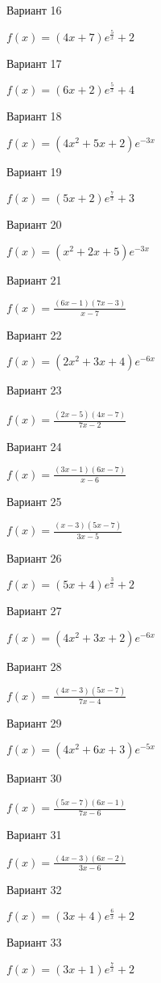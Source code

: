 \documentclass[11pt]{report}
\begin{document}
Вариант 16

$f(x) = \left(4 x + 7\right) e^{\frac{5}{x}} + 2$

Вариант 17

$f(x) = \left(6 x + 2\right) e^{\frac{5}{x}} + 4$

Вариант 18

$f(x) = \left(4 x^{2} + 5 x + 2\right) e^{- 3 x}$

Вариант 19

$f(x) = \left(5 x + 2\right) e^{\frac{7}{x}} + 3$

Вариант 20

$f(x) = \left(x^{2} + 2 x + 5\right) e^{- 3 x}$

Вариант 21

$f(x) = \frac{\left(6 x - 1\right) \left(7 x - 3\right)}{x - 7}$

Вариант 22

$f(x) = \left(2 x^{2} + 3 x + 4\right) e^{- 6 x}$

Вариант 23

$f(x) = \frac{\left(2 x - 5\right) \left(4 x - 7\right)}{7 x - 2}$

Вариант 24

$f(x) = \frac{\left(3 x - 1\right) \left(6 x - 7\right)}{x - 6}$

Вариант 25

$f(x) = \frac{\left(x - 3\right) \left(5 x - 7\right)}{3 x - 5}$

Вариант 26

$f(x) = \left(5 x + 4\right) e^{\frac{3}{x}} + 2$

Вариант 27

$f(x) = \left(4 x^{2} + 3 x + 2\right) e^{- 6 x}$

Вариант 28

$f(x) = \frac{\left(4 x - 3\right) \left(5 x - 7\right)}{7 x - 4}$

Вариант 29

$f(x) = \left(4 x^{2} + 6 x + 3\right) e^{- 5 x}$

Вариант 30

$f(x) = \frac{\left(5 x - 7\right) \left(6 x - 1\right)}{7 x - 6}$

Вариант 31

$f(x) = \frac{\left(4 x - 3\right) \left(6 x - 2\right)}{3 x - 6}$

Вариант 32

$f(x) = \left(3 x + 4\right) e^{\frac{6}{x}} + 2$

Вариант 33

$f(x) = \left(3 x + 1\right) e^{\frac{7}{x}} + 2$
\end{document}

